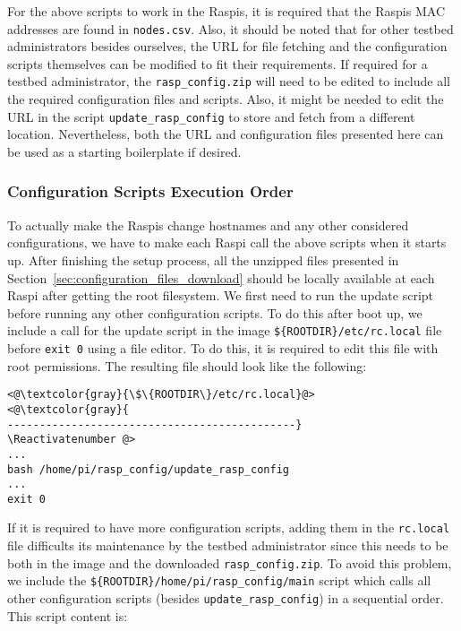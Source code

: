 For the above scripts to work in the \ac{Raspi}s, it is required that the
\ac{Raspi}s \ac{MAC} addresses are found in \texttt{nodes.csv}. Also, it
should be noted that for other testbed administrators besides ourselves,
the \ac{URL} for file fetching and the configuration
scripts themselves can be modified to fit their requirements. If
required for a testbed administrator, the \texttt{rasp\_config.zip}
will need to be edited to include all the required configuration files
and scripts. Also, it might be needed to edit the \ac{URL} in the script
\texttt{update\_rasp\_config} to store and fetch from a different location.
Nevertheless, both the \ac{URL} and configuration files presented here can be
used as a starting boilerplate if desired.

\subsubsection{Configuration Scripts Execution Order}
To actually make the \ac{Raspi}s change hostnames and any other considered
configurations, we have to make each \ac{Raspi} call the above scripts when
it starts up. After finishing the setup process, all the unzipped files
presented in Section~\ref{sec:configuration_files_download} should be
locally available at each \ac{Raspi} after getting the root filesystem.
We first need to run the update script before running
any other configuration scripts. To do this after boot up, we include
a call for the update script in the image \texttt{\$\{ROOTDIR\}/etc/rc.local}
file before \texttt{exit 0} using a file editor. To do this, it is required
to edit this file with root permissions. The resulting file should look like the following:

\Suppressnumber\begin{lstlisting}[]
<@\textcolor{gray}{\$\{ROOTDIR\}/etc/rc.local}@>
<@\textcolor{gray}{
---------------------------------------------}
\Reactivatenumber @>
...
bash /home/pi/rasp_config/update_rasp_config
...
exit 0
\end{lstlisting}
\FloatBarrier
\vspace{-5mm}

If it is required to have more configuration scripts, adding them
in the \texttt{rc.local} file difficults its maintenance by the testbed
administrator since this needs to be both in the image and the
downloaded \texttt{rasp\_config.zip}. To avoid this problem, we include
the \texttt{\$\{ROOTDIR\}/home/pi/rasp\_config/main} script which
calls all other configuration scripts (besides \texttt{update\_rasp\_config})
in a sequential order. This script content is:

